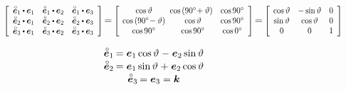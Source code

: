\begin{figure}[!htbp]
\begin{center}
\begin{tikzpicture}[scale=4, tdplot_main_coords]
\end{tikzpicture}
\end{center}

\vspace{-1em}\[
\scalebox{0.8}[0.85]{$\left[ \begin{array}{ccc}
\mathcircabove{\bm{e}}_1 \dotp \bm{e}_1 & \mathcircabove{\bm{e}}_1 \dotp \bm{e}_2 & \mathcircabove{\bm{e}}_1 \dotp \bm{e}_3 \\
\mathcircabove{\bm{e}}_2 \dotp \bm{e}_1 & \mathcircabove{\bm{e}}_2 \dotp \bm{e}_2 & \mathcircabove{\bm{e}}_2 \dotp \bm{e}_3 \\
\mathcircabove{\bm{e}}_3 \dotp \bm{e}_1 & \mathcircabove{\bm{e}}_3 \dotp \bm{e}_2 & \mathcircabove{\bm{e}}_3 \dotp \bm{e}_3
\end{array} \right]$} \hspace{-0.32ex} = \hspace{-0.2ex}
%
\scalebox{0.8}[0.85]{$\left[ \hspace{-0.2ex} \begin{array}{ccc}
\operatorname{cos} \vartheta & \hspace{-1ex} \operatorname{cos} \left( 90\degree \!+ \vartheta \right) & \operatorname{cos} 90\degree \\
\operatorname{cos} \left( 90\degree \!- \vartheta \right) & \operatorname{cos} \vartheta & \operatorname{cos} 90\degree \\
\operatorname{cos} 90\degree & \operatorname{cos} 90\degree & \operatorname{cos} 0\degree
\end{array} \right]$} \hspace{-0.32ex} = \hspace{-0.2ex}
%
\scalebox{0.8}[0.85]{$\left[ \hspace{-0.1ex} \begin{array}{ccc}
\operatorname{cos} \vartheta & - \operatorname{sin} \vartheta & 0 \\
\operatorname{sin} \vartheta & \operatorname{cos} \vartheta & 0 \\
0 & 0 & 1
\end{array} \right]$}
\]

\vspace{-0.8em}
\[\begin{array}{c}
\mathcircabove{\bm{e}}_1 \hspace{-0.16ex} = \bm{e}_1 \operatorname{cos} \vartheta \hspace{.1ex} - \hspace{.1ex} \bm{e}_2 \operatorname{sin} \vartheta \\[0.1em]
\mathcircabove{\bm{e}}_2 \hspace{-0.16ex} = \bm{e}_1 \operatorname{sin} \vartheta \hspace{.1ex} + \hspace{.1ex} \bm{e}_2 \operatorname{cos} \vartheta \\[0.1em]
\mathcircabove{\bm{e}}_3 \hspace{-0.16ex} = \bm{e}_3 = \bm{k}
\end{array}\]


\end{figure}

